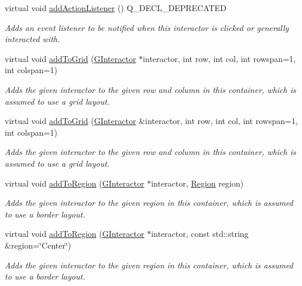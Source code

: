 \begin{DoxyCompactItemize}
virtual void \mbox{\hyperlink{classGInteractor_a02f20ea6edfa0671f31c4c648a253833}{add\+Action\+Listener}} () Q\+\_\+\+D\+E\+C\+L\+\_\+\+D\+E\+P\+R\+E\+C\+A\+T\+ED
\begin{DoxyCompactList}\small\item\em Adds an event listener to be notified when this interactor is clicked or generally interacted with. \end{DoxyCompactList}\item 
virtual void \mbox{\hyperlink{classGContainer_adf2c09cdcbf0f38c03d75a250fd8ce5d}{add\+To\+Grid}} (\mbox{\hyperlink{classGInteractor}{G\+Interactor}} $\ast$interactor, int row, int col, int rowspan=1, int colspan=1)
\begin{DoxyCompactList}\small\item\em Adds the given interactor to the given row and column in this container, which is assumed to use a grid layout. \end{DoxyCompactList}\item 
virtual void \mbox{\hyperlink{classGContainer_abc297ebf9136261c21e2df3c771df0b3}{add\+To\+Grid}} (\mbox{\hyperlink{classGInteractor}{G\+Interactor}} \&interactor, int row, int col, int rowspan=1, int colspan=1)
\begin{DoxyCompactList}\small\item\em Adds the given interactor to the given row and column in this container, which is assumed to use a grid layout. \end{DoxyCompactList}\item 
virtual void \mbox{\hyperlink{classGContainer_aab55413917cdbb2e0560ab415d59fd1f}{add\+To\+Region}} (\mbox{\hyperlink{classGInteractor}{G\+Interactor}} $\ast$interactor, \mbox{\hyperlink{classGContainer_a81a01a86de31071a92e6cce0bab9bc4b}{Region}} region)
\begin{DoxyCompactList}\small\item\em Adds the given interactor to the given region in this container, which is assumed to use a border layout. \end{DoxyCompactList}\item 
virtual void \mbox{\hyperlink{classGContainer_a9c8e600889001e6e72d3548918a6baff}{add\+To\+Region}} (\mbox{\hyperlink{classGInteractor}{G\+Interactor}} $\ast$interactor, const std\+::string \&region=\char`\"{}Center\char`\"{})
\begin{DoxyCompactList}\small\item\em Adds the given interactor to the given region in this container, which is assumed to use a border layout. \end{DoxyCompactList}\item 

\end{DoxyCompactItemize}
